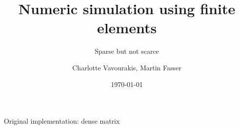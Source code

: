 \documentclass[aspectratio=169,xcolor=dvipsnames]{beamer}
\title[short title]{Numeric simulation using finite elements}
\subtitle{Sparse but not scarce}
\author {Charlotte Vavourakis, Martin Fasser}
\institute[UIBK] %
{
    University of Innsbruck
    \vskip 3pt
}
\date{\today} %
\begin{document}
\begin{frame}
    \titlepage
\end{frame}




\begin{frame}{Original implementation: dense matrix}
    \begin{center}
    \end{center}
\end{frame}
\end{document}
